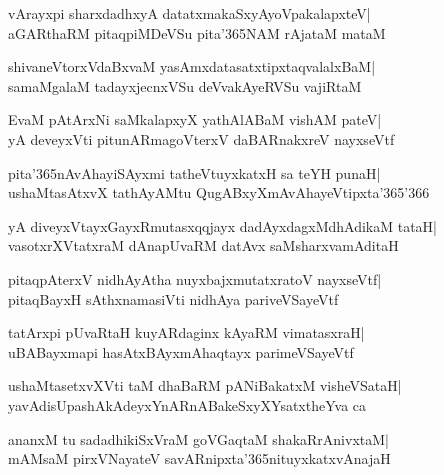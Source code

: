 \documentclass[twoside,12pt,openright]{book}
\newcounter{shloka}[chapter]
\begin{document}
\begin{shloka}%
vArayxpi sharxdadhxyA datatxmakaSxyAyoVpakalapxteV|\\
aGARthaRM pitaqpiMDeVSu pita\char'365NAM rAjataM mataM
\end{shloka}

\begin{shloka}%
shivaneVtorxVdaBxvaM yasAmxdatasatxtipxtaqvalalxBaM|\\
samaMgalaM tadayxjecnxVSu deVvakAyeRVSu vajiRtaM
\end{shloka}

\begin{shloka}%
EvaM pAtArxNi saMkalapxyX yathAlABaM vishAM pateV|\\
yA deveyxVti pitunARmagoVterxV daBARnakxreV nayxseVtf
\end{shloka}

\begin{shloka}%
pita\char'365nAvAhayiSAyxmi tatheVtuyxkatxH sa teYH punaH|\\
ushaMtasAtxvX tathAyAMtu QugABxyXmAvAhayeVtipxta\char'365\char'366
\end{shloka}

\begin{shloka}%
yA diveyxVtayxGayxRmutasxqqjayx dadAyxdagxMdhAdikaM tataH|\\
vasotxrXVtatxraM dAnapUvaRM datAvx saMsharxvamAditaH
\end{shloka}

\begin{shloka}%
pitaqpAterxV nidhAyAtha nuyxbajxmutatxratoV nayxseVtf|\\
pitaqBayxH sAthxnamasiVti nidhAya pariveVSayeVtf
\end{shloka}

\begin{shloka}%
tatArxpi pUvaRtaH kuyARdaginx kAyaRM vimatasxraH|\\
uBABayxmapi hasAtxBAyxmAhaqtayx parimeVSayeVtf 
\end{shloka}

\begin{shloka}%
ushaMtasetxvXVti taM dhaBaRM pANiBakatxM visheVSataH|\\
yavAdisUpashAkAdeyxYnARnABakeSxyXYsatxtheYva ca
\end{shloka}

\begin{shloka}%
ananxM tu sadadhikiSxVraM goVGaqtaM shakaRrAnivxtaM|\\
mAMsaM pirxVNayateV savARnipxta\char'365nituyxkatxvAnajaH
\end{shloka}
\end{document}

